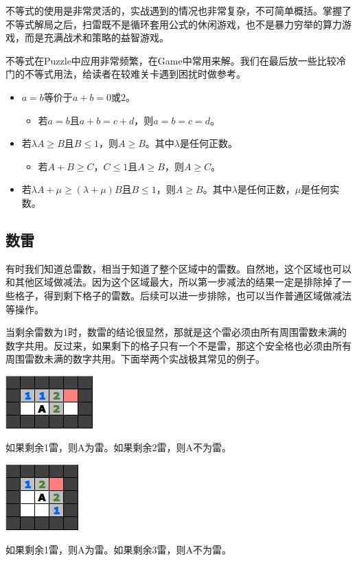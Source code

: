 不等式的使用是非常灵活的，实战遇到的情况也非常复杂，不可简单概括。掌握了不等式解局之后，扫雷既不是循环套用公式的休闲游戏，也不是暴力穷举的算力游戏，而是充满战术和策略的益智游戏。

不等式在Puzzle中应用非常频繁，在Game中常用来解。我们在最后放一些比较冷门的不等式用法，给读者在较难关卡遇到困扰时做参考。

\begin{itemize}
	\item $a=b$等价于$a+b=0$或$2$。
	\begin{itemize}
		\item 若$a=b$且$a+b=c+d$，则$a=b=c=d$。
	\end{itemize}
	\item 若$\lambda A\ge B$且$B\le 1$，则$A\ge B$。其中$\lambda$是任何正数。
	\begin{itemize}
		\item 若$A+B\ge C$，$C\le 1$且$A\ge B$，则$A\ge C$。
	\end{itemize}
	\item 若$\lambda A+\mu\ge (\lambda+\mu)B$且$B\le 1$，则$A\ge B$。其中$\lambda$是任何正数，$\mu$是任何实数。
\end{itemize}

\subsection{数雷}
有时我们知道总雷数，相当于知道了整个区域中的雷数。自然地，这个区域也可以和其他区域做减法。因为这个区域最大，所以第一步减法的结果一定是排除掉了一些格子，得到剩下格子的雷数。后续可以进一步排除，也可以当作普通区域做减法等操作。

当剩余雷数为1时，数雷的结论很显然，那就是这个雷必须由所有周围雷数未满的数字共用。反过来，如果剩下的格子只有一个不是雷，那这个安全格也必须由所有周围雷数未满的数字共用。下面举两个实战极其常见的例子。

\vspace{5mm}
\begin{center}
    \includegraphics{trick/数雷1.png}
\end{center}
如果剩余1雷，则A为雷。如果剩余2雷，则A不为雷。

\vspace{5mm}
\begin{center}
    \includegraphics{trick/数雷2.png}
\end{center}
如果剩余1雷，则A为雷。如果剩余3雷，则A不为雷。